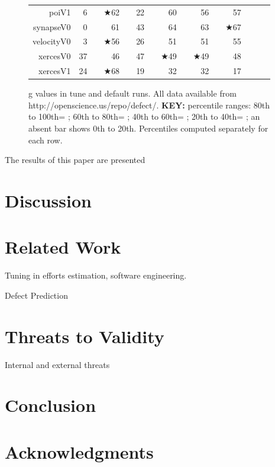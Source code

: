 \documentclass{sig-alternative}
\newcommand{\rone}{}
\newcommand{\rtwo}{}
\newcommand{\rthree}{}
\newcommand{\rfour}{}
\begin{document}
\begin{figure}
{\begin{tabular}{r@{~}|r@{~}l@{~}|r@{~}l@{~}|r@{~}l|r@{~}l@{~}|r@{~}l@{~}|r@{~}l@{~}r@{~}l}
poiV1 & 6 &         & $\bigstar$62 & {\rfour} & 22 & {\rone} & 60 & {\rfour} & 56 & {\rfour} & 57 & {\rfour}\\
synapseV0 & 0 &         & 61 & {\rfour} & 43 & {\rthree} & 64 & {\rfour} & 63 & {\rfour} & $\bigstar$67 & {\rfour}\\
velocityV0 & 3 &         & $\bigstar$56 & {\rfour} & 26 & {\rtwo} & 51 & {\rfour} & 51 & {\rfour} & 55 & {\rfour}\\
xercesV0 & 37 &         & 46 & {\rthree} & 47 & {\rfour} & $\bigstar$49 & {\rfour} & $\bigstar$49 & {\rfour} & 48 & {\rfour}\\
xercesV1 & 24 &         & $\bigstar$68 & {\rfour} & 19 &         & 32 & {\rone} & 32 & {\rone} & 17 &        \\
\end{tabular}
}
\caption{g values in tune and default runs.
All data available from http://openscience.us/repo/defect/. {\bf KEY:}
  percentile ranges:\newline
80th to 100th= {\rfour};
60th to 80th= {\rthree};
40th to 60th= {\rtwo};
20th to 40th= {\rone};
an absent bar shows  0th to 20th.
Percentiles computed  separately
for each row.}
\label{fig:gbars}

\end{figure}

The results of this paper are presented 
 
 
\section{Discussion}
 

\section{Related Work}

Tuning in efforts estimation, software engineering.

Defect Prediction



\section{Threats to Validity}

Internal and external threats

\section{Conclusion}

\section{Acknowledgments}

\vspace*{0.5mm}
 
 \scriptsize

  


   



  


  
\end{document}
